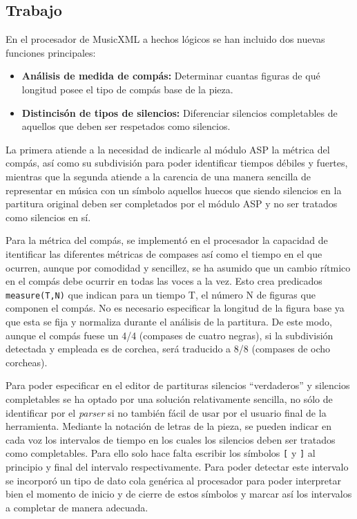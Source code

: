 \subsection{Trabajo}
En el procesador de MusicXML a hechos lógicos se han incluido dos nuevas funciones principales: 
\begin{itemize}
	\item \textbf{Análisis de medida de compás:} Determinar cuantas figuras de qué longitud posee el tipo de compás base de la pieza.
	\item \textbf{Distincisón de tipos de silencios:} Diferenciar silencios completables de aquellos que deben ser respetados como silencios.
\end{itemize}
La primera atiende a la necesidad de indicarle al módulo ASP la métrica del compás, así como su subdivisión para poder identificar tiempos débiles y fuertes, mientras que la segunda atiende a la carencia de una manera sencilla de representar en música con un símbolo aquellos huecos que siendo silencios en la partitura original deben ser completados por el módulo ASP y no ser tratados como silencios en sí. 

Para la métrica del compás, se implementó en el procesador la capacidad de itentificar las diferentes métricas de compases así como el tiempo en el que ocurren, aunque por comodidad y sencillez, se ha asumido que un cambio rítmico en el compás debe ocurrir en todas las voces a la vez. Esto crea predicados \texttt{measure(T,N)} que indican para un tiempo T, el número N de figuras que componen el compás. No es necesario especificar la longitud de la figura base ya que esta se fija y normaliza durante el análisis de la partitura. De este modo, aunque el compás fuese un 4/4 (compases de cuatro negras), si la subdivisión detectada y empleada es de corchea, será traducido a 8/8 (compases de ocho corcheas). 

Para poder especificar en el editor de partituras silencios ``verdaderos'' y silencios completables se ha optado por una solución relativamente sencilla, no sólo de identificar por el \textit{parser} si no también fácil de usar por el usuario final de la herramienta. Mediante la notación de letras de la pieza, se pueden indicar en cada voz los intervalos de tiempo en los cuales los silencios deben ser tratados como completables. Para ello solo hace falta escribir los símbolos \texttt{[} y \texttt{]} al principio y final del intervalo respectivamente. Para poder detectar este intervalo se incorporó un tipo de dato cola genérica al procesador para poder interpretar bien el momento de inicio y de cierre de estos símbolos y marcar así los intervalos a completar de manera adecuada.

